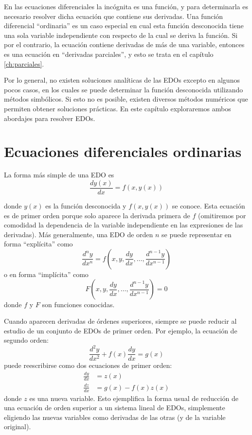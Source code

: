 En las ecuaciones diferenciales la incógnita es una función, y para determinarla es necesario resolver dicha ecuación que contiene sus derivadas. Una función diferencial ``ordinaria'' es un caso especial en cual esta función desconocida tiene una sola variable independiente con respecto de la cual se deriva la función. Si por el contrario, la ecuación contiene derivadas de más de una variable, entonces es una ecuación en ``derivadas parciales'', y esto se trata en el capítulo \ref{ch:parciales}.

Por lo general, no existen soluciones analíticas de las EDOs excepto en algunos pocos casos, en los cuales se puede determinar la función desconocida utilizando métodos simbólicos. Si esto no es posible, existen diversos métodos numéricos que permiten obtener soluciones prácticas. En este capítulo exploraremos ambos abordajes para resolver EDOs.

\section{Ecuaciones diferenciales ordinarias}

La forma más simple de una EDO es 
\begin{equation}
 \frac{dy(x)}{dx} = f(x, y(x))
\end{equation}

donde $y(x)$ es la función desconocida y $f(x, y(x))$ se conoce. Esta ecuación es de primer orden porque solo aparece la derivada primera de $f$ (omitiremos por comodidad la dependencia de la variable independiente en las expresiones de las derivadas).  Más generalmente, una EDO de orden $n$ se puede representar en forma ``explícita'' como
\begin{equation}
 \frac{d^ny}{dx^n} = f \left( x, y, \frac{dy}{dx}, \ldots, \frac{d^{n-1}y}{dx^{n-1}} \right)
\end{equation} 
o en forma ``implícita'' como
\begin{equation}
 F \left( x, y, \frac{dy}{dx}, \ldots, \frac{d^{n-1}y}{dx^{n-1}} \right) = 0
\end{equation} 
donde $f$ y $F$ son funciones conocidas.

Cuando aparecen derivadas de órdenes superiores, siempre se puede  reducir al estudio de un conjunto de EDOs de primer orden. Por ejemplo, la ecuación de segundo orden:
\begin{equation}
 \frac{d^2y}{dx^2}+f(x) \frac{dy}{dx} = g(x)
\end{equation}
puede reescribirse como dos ecuaciones de primer orden:
\begin{align}
 \frac{dy}{dx} &= z(x) \\
 \frac{dz}{dx} &= g(x) - f(x)z(x)
\end{align}
donde $z$ es una nueva variable. Esto ejemplifica la forma usual de reducción de una ecuación de orden superior a un sistema lineal de EDOs, simplemente eligiendo las nuevas variables como derivadas de las otras (y de la variable original).

